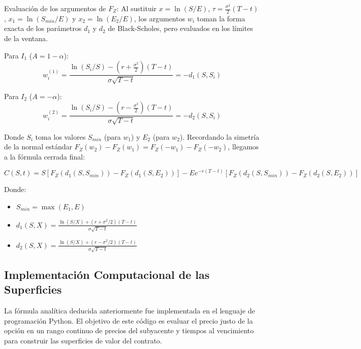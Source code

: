 \documentclass[12pt, a4paper]{article}
\begin{document}
Evaluación de los argumentos de $F_Z$: Al sustituir $x = \ln(S/E)$, $\tau = \frac{\sigma^2}{2}(T-t)$, $x_1 = \ln(S_{min}/E)$ y $x_2 = \ln(E_2/E)$, los argumentos $w_i$ toman la forma exacta de los parámetros $d_1$ y $d_2$ de Black-Scholes, pero evaluados en los límites de la ventana.

Para $I_1$ ($A = 1-\alpha$):
\[ w^{(1)}_i = \frac{\ln(S_i/S) - (r + \frac{\sigma^2}{2})(T-t)}{\sigma\sqrt{T-t}} = -d_1(S, S_i) \]

Para $I_2$ ($A = -\alpha$):
\[ w^{(2)}_i = \frac{\ln(S_i/S) - (r - \frac{\sigma^2}{2})(T-t)}{\sigma\sqrt{T-t}} = -d_2(S, S_i) \]

Donde $S_i$ toma los valores $S_{min}$ (para $w_1$) y $E_2$ (para $w_2$). Recordando la simetría de la normal estándar $F_Z(w_2) - F_Z(w_1) = F_Z(-w_1) - F_Z(-w_2)$, llegamos a la fórmula cerrada final:

\begin{equation}
    C(S,t) = S \left[ F_Z(d_1(S, S_{min})) - F_Z(d_1(S, E_2)) \right] - E e^{-r(T-t)} \left[ F_Z(d_2(S, S_{min})) - F_Z(d_2(S, E_2)) \right]
\end{equation}

Donde:
\begin{itemize}
    \item $S_{min} = \max(E_1, E)$
    \item $d_1(S, X) = \frac{\ln(S/X) + (r + \sigma^2/2)(T-t)}{\sigma\sqrt{T-t}}$
    \item $d_2(S, X) = \frac{\ln(S/X) + (r - \sigma^2/2)(T-t)}{\sigma\sqrt{T-t}}$
\end{itemize}

\subsection{Implementación Computacional de las Superficies}

La fórmula analítica deducida anteriormente fue implementada en el lenguaje de programación Python. El objetivo de este código es evaluar el precio justo de la opción en un rango continuo de precios del subyacente y tiempos al vencimiento para construir las superficies de valor del contrato.
\end{document}
